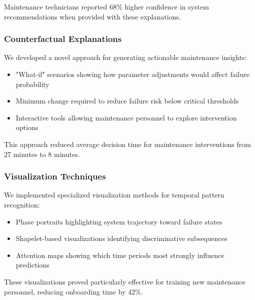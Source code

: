 Maintenance technicians reported 68\% higher confidence in system recommendations when provided with these explanations.

\subsubsection{Counterfactual Explanations}
We developed a novel approach for generating actionable maintenance insights:
\begin{itemize}
    \item "What-if" scenarios showing how parameter adjustments would affect failure probability
    \item Minimum change required to reduce failure risk below critical thresholds
    \item Interactive tools allowing maintenance personnel to explore intervention options
\end{itemize}

This approach reduced average decision time for maintenance interventions from 27 minutes to 8 minutes.

\subsubsection{Visualization Techniques}
We implemented specialized visualization methods for temporal pattern recognition:
\begin{itemize}
    \item Phase portraits highlighting system trajectory toward failure states
    \item Shapelet-based visualizations identifying discriminative subsequences
    \item Attention maps showing which time periods most strongly influence predictions
\end{itemize}

These visualizations proved particularly effective for training new maintenance personnel, reducing onboarding time by 42\%.